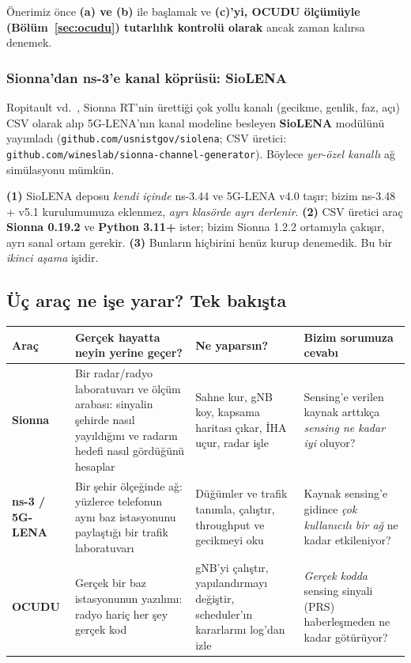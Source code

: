Önerimiz önce \textbf{(a) ve (b)} ile başlamak ve \textbf{(c)'yi, OCUDU ölçümüyle (Bölüm~\ref{sec:ocudu}) tutarlılık kontrolü olarak} ancak zaman kalırsa denemek.

\subsubsection{Sionna'dan ns-3'e kanal köprüsü: SioLENA}

Ropitault vd.~\cite{siolena}, Sionna RT'nin ürettiği çok yollu kanalı (gecikme, genlik, faz, açı) CSV olarak alıp 5G-LENA'nın kanal modeline besleyen \textbf{SioLENA} modülünü yayımladı
(\texttt{github.com/usnistgov/siolena}; CSV üretici: \texttt{github.com/wineslab/sionna-channel-generator}). Böylece \emph{yer-özel kanallı} ağ simülasyonu mümkün.

\begin{dikkat}
\textbf{(1)} SioLENA deposu \emph{kendi içinde} ns-3.44 ve 5G-LENA v4.0 taşır; bizim ns-3.48 + v5.1 kurulumumuza eklenmez, \emph{ayrı klasörde ayrı derlenir}.
\textbf{(2)} CSV üretici araç \textbf{Sionna 0.19.2} ve \textbf{Python 3.11+} ister; bizim Sionna 1.2.2 ortamıyla çakışır, ayrı sanal ortam gerekir.
\textbf{(3)} Bunların hiçbirini henüz kurup denemedik. Bu bir \emph{ikinci aşama} işidir.
\end{dikkat}

\subsection{Üç araç ne işe yarar? Tek bakışta}\label{sec:tek-bakis}

\begin{center}
\sffamily\small
\begin{tabularx}{\textwidth}{@{}p{2.3cm}p{3.9cm}p{3.7cm}X@{}}
\toprule
\textbf{Araç} & \textbf{Gerçek hayatta neyin yerine geçer?} & \textbf{Ne yaparsın?} & \textbf{Bizim sorumuza cevabı} \\
\midrule
\textbf{Sionna} & Bir radar/radyo laboratuvarı ve ölçüm arabası: sinyalin şehirde nasıl yayıldığını ve radarın hedefi nasıl gördüğünü hesaplar & Sahne kur, gNB koy, kapsama haritası çıkar, İHA uçur, radar işle & Sensing'e verilen kaynak arttıkça \emph{sensing ne kadar iyi} oluyor? \\
\textbf{ns-3 / 5G-LENA} & Bir şehir ölçeğinde ağ: yüzlerce telefonun aynı baz istasyonunu paylaştığı bir trafik laboratuvarı & Düğümler ve trafik tanımla, çalıştır, throughput ve gecikmeyi oku & Kaynak sensing'e gidince \emph{çok kullanıcılı bir ağ} ne kadar etkileniyor? \\
\textbf{OCUDU} & Gerçek bir baz istasyonunun yazılımı: radyo hariç her şey gerçek kod & gNB'yi çalıştır, yapılandırmayı değiştir, scheduler'ın kararlarını log'dan izle & \emph{Gerçek kodda} sensing sinyali (PRS) haberleşmeden ne kadar götürüyor? \\
\bottomrule
\end{tabularx}
\end{center}

